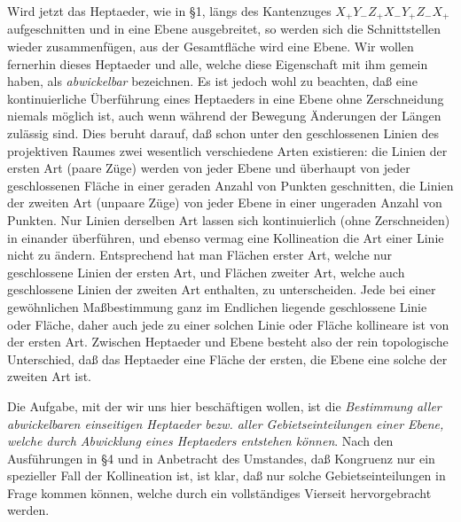 \documentclass[11pt,a4paper]{article}
\begin{document}
Wird jetzt das Heptaeder, wie in \S 1, l\"angs des Kantenzuges $X_+Y_-Z_+X_-Y_+Z_-X_+$ aufgeschnitten und in eine Ebene ausgebreitet, so werden sich die Schnittstellen wieder zusammenf\"ugen, aus der Gesamtfl\"ache wird eine Ebene. Wir wollen fernerhin dieses Heptaeder und alle, welche diese Eigenschaft mit ihm gemein haben, als \emph{abwickelbar} bezeichnen. Es ist jedoch wohl zu beachten, da\ss{} eine kontinuierliche \"Uberf\"uhrung eines Heptaeders in eine Ebene ohne Zerschneidung niemals m\"oglich ist, auch wenn w\"ahrend der Bewegung \"Anderungen der L\"angen zul\"assig sind. Dies beruht darauf, da\ss{} schon unter den geschlossenen Linien des projektiven Raumes zwei wesentlich verschiedene Arten existieren: die Linien der ersten Art (paare Z\"uge) werden von jeder Ebene und \"uberhaupt von jeder geschlossenen Fl\"ache in einer geraden Anzahl von Punkten geschnitten, die Linien der zweiten Art (unpaare Z\"uge) von jeder Ebene in einer ungeraden Anzahl von Punkten. Nur Linien derselben Art lassen sich kontinuierlich (ohne Zerschneiden) in einander \"uberf\"uhren, und ebenso vermag eine Kollineation die Art einer Linie nicht zu \"andern. Entsprechend hat man Fl\"achen erster Art, welche nur geschlossene Linien der ersten Art, und Fl\"achen zweiter Art, welche auch geschlossene Linien der zweiten Art enthalten, zu unterscheiden. Jede bei einer gew\"ohnlichen Ma\ss{}bestimmung ganz im Endlichen liegende geschlossene Linie oder Fl\"ache, daher auch jede zu einer solchen Linie oder Fl\"ache kollineare ist von der ersten Art. Zwischen Heptaeder und Ebene besteht also der rein topologische Unterschied, da\ss{} das Heptaeder eine Fl\"ache der ersten, die Ebene eine solche der zweiten Art ist.

Die Aufgabe, mit der wir uns hier besch\"aftigen wollen, ist die \emph{Bestimmung aller abwickelbaren einseitigen Heptaeder bezw. aller Gebietseinteilungen einer Ebene, welche durch Abwicklung eines Heptaeders entstehen k\"onnen}. Nach den Ausf\"uhrungen in \S 4 und in Anbetracht des Umstandes, da\ss{} Kongruenz nur ein spezieller Fall der Kollineation ist, ist klar, da\ss{} nur solche Gebietseinteilungen in Frage kommen k\"onnen, welche durch ein vollst\"andiges Vierseit hervorgebracht werden.
\end{document}
